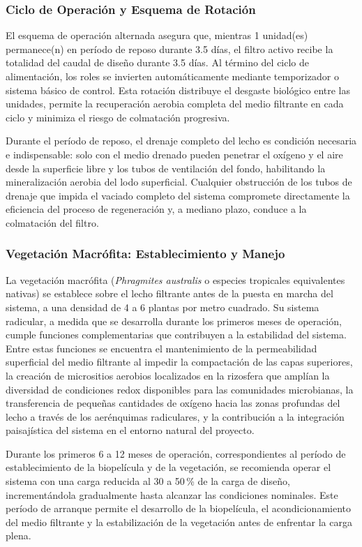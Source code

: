 \documentclass[12pt,a4paper]{article}
\begin{document}
\subsubsection*{Ciclo de Operación y Esquema de Rotación}

El esquema de operación alternada asegura que, mientras 1 unidad(es) permanece(n) en período de reposo durante 3.5 días, el filtro activo recibe la totalidad del caudal de diseño durante 3.5 días. Al término del ciclo de alimentación, los roles se invierten automáticamente mediante temporizador o sistema básico de control. Esta rotación distribuye el desgaste biológico entre las unidades, permite la recuperación aerobia completa del medio filtrante en cada ciclo y minimiza el riesgo de colmatación progresiva.

Durante el período de reposo, el drenaje completo del lecho es condición necesaria e indispensable: solo con el medio drenado pueden penetrar el oxígeno y el aire desde la superficie libre y los tubos de ventilación del fondo, habilitando la mineralización aerobia del lodo superficial. Cualquier obstrucción de los tubos de drenaje que impida el vaciado completo del sistema compromete directamente la eficiencia del proceso de regeneración y, a mediano plazo, conduce a la colmatación del filtro.

\subsubsection*{Vegetación Macrófita: Establecimiento y Manejo}

La vegetación macrófita (\textit{Phragmites australis} o especies tropicales equivalentes nativas) se establece sobre el lecho filtrante antes de la puesta en marcha del sistema, a una densidad de 4 a 6 plantas por metro cuadrado. Su sistema radicular, a medida que se desarrolla durante los primeros meses de operación, cumple funciones complementarias que contribuyen a la estabilidad del sistema. Entre estas funciones se encuentra el mantenimiento de la permeabilidad superficial del medio filtrante al impedir la compactación de las capas superiores, la creación de micrositios aerobios localizados en la rizosfera que amplían la diversidad de condiciones redox disponibles para las comunidades microbianas, la transferencia de pequeñas cantidades de oxígeno hacia las zonas profundas del lecho a través de los aerénquimas radiculares, y la contribución a la integración paisajística del sistema en el entorno natural del proyecto.

Durante los primeros 6 a 12 meses de operación, correspondientes al período de establecimiento de la biopelícula y de la vegetación, se recomienda operar el sistema con una carga reducida al 30 a 50\,\% de la carga de diseño, incrementándola gradualmente hasta alcanzar las condiciones nominales. Este período de arranque permite el desarrollo de la biopelícula, el acondicionamiento del medio filtrante y la estabilización de la vegetación antes de enfrentar la carga plena.
\end{document}

